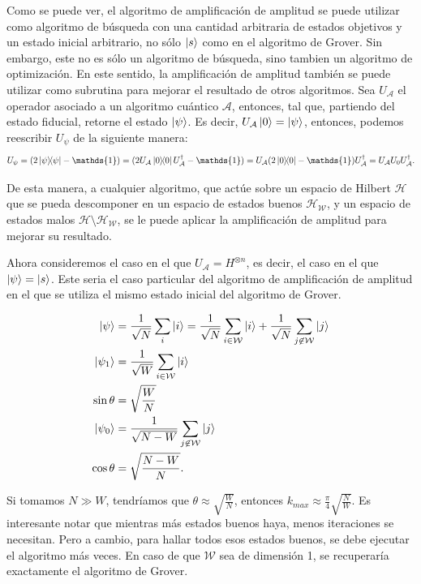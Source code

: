 Como se puede ver, el algoritmo de amplificación de amplitud se puede utilizar como algoritmo de búsqueda con una cantidad arbitraria de estados objetivos y un estado inicial arbitrario, no sólo $\ket{s}$ como en el algoritmo de Grover. Sin embargo, este no es sólo un algoritmo de búsqueda, sino tambien un algoritmo de optimización. En este sentido, la amplificación de amplitud también se puede utilizar como subrutina para mejorar el resultado de otros algoritmos. Sea $U_\mathcal{A}$ el operador asociado a un algoritmo cuántico $\mathcal{A}$, entonces, tal que, partiendo del estado fiducial, retorne el estado $\ket{\psi}$. Es decir, $U_\mathcal{A} \ket{0} = \ket{\psi}$, entonces, podemos reescribir $U_\psi$ de la siguiente manera:
\begin{equation}
    U_\psi = (2 \ketbra{\psi} - \mathds{1}) = (2 U_\mathcal{A} \ketbra{0} U_\mathcal{A}^\dagger - \mathds{1}) = U_\mathcal{A} (2 \ketbra{0} - \mathds{1}) U_\mathcal{A}^\dagger = U_\mathcal{A} U_0 U_\mathcal{A}^\dagger .
\end{equation}

De esta manera, a cualquier algoritmo, que actúe sobre un espacio de Hilbert $\mathcal{H}$ que se pueda descomponer en un espacio de estados buenos $\mathcal{H}_\mathcal{W}$, y un espacio de estados malos $\mathcal{H} \setminus \mathcal{H}_\mathcal{W}$, se le puede aplicar la amplificación de amplitud para mejorar su resultado.

Ahora consideremos el caso en el que $U_\mathcal{A} = H^{\otimes n}$, es decir, el caso en el que $\ket{\psi} = \ket{s}$. Este seria el caso particular del algoritmo de amplificación de amplitud en el que se utiliza el mismo estado inicial del algoritmo de Grover.

\begin{align}
    \ket{\psi} &= \frac{1}{\sqrt{N}} \sum\limits_i \ket{i} = \frac{1}{\sqrt{N}} \sum\limits_{i \in \mathcal{W}} \ket{i} + \frac{1}{\sqrt{N}} \sum\limits_{j \not\in \mathcal{W}} \ket{j} \\
    \ket{\psi_1} &= \frac{1}{\sqrt{W}} \sum\limits_{i \in \mathcal{W}} \ket{i} \\
    \sin{\theta} &= \sqrt{\frac{W}{N}} \\
    \ket{\psi_0} &= \frac{1}{\sqrt{N-W}} \sum\limits_{j \not\in \mathcal{W}} \ket{j} \\
    \cos{\theta} &= \sqrt{\frac{N-W}{N}} .
\end{align}

Si tomamos $N \gg W$, tendríamos que $\theta \approx \sqrt{\frac{W}{N}}$, entonces $k_{max} \approx \frac{\pi}{4} \sqrt{\frac{N}{W}}$. Es interesante notar que mientras más estados buenos haya, menos iteraciones se necesitan. Pero a cambio, para hallar todos esos estados buenos, se debe ejecutar el algoritmo más veces. En caso de que $\mathcal{W}$ sea de dimensión 1, se recuperaría exactamente el algoritmo de Grover.

